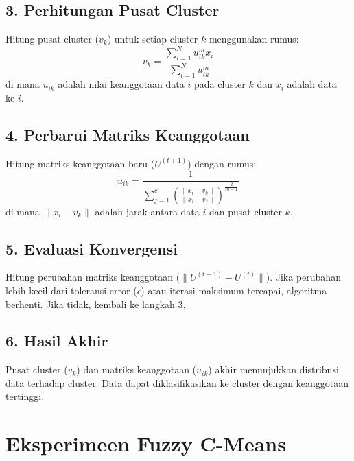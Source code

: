 \documentclass[
  oneside]{book}
\begin{document}
\subsection*{3. Perhitungan Pusat Cluster}\label{perhitungan-pusat-cluster}

Hitung pusat cluster (\(v_k\)) untuk setiap cluster \(k\) menggunakan rumus:
\[
     v_k = \frac{\sum_{i=1}^N u_{ik}^m x_i}{\sum_{i=1}^N u_{ik}^m}
     \]
di mana \(u_{ik}\) adalah nilai keanggotaan data \(i\) pada cluster \(k\) dan \(x_i\) adalah data ke-\(i\).

\subsection*{4. Perbarui Matriks Keanggotaan}\label{perbarui-matriks-keanggotaan}

Hitung matriks keanggotaan baru (\(U^{(t+1)}\)) dengan rumus:
\[
     u_{ik} = \frac{1}{\sum_{j=1}^c \left( \frac{\|x_i - v_k\|}{\|x_i - v_j\|} \right)^{\frac{2}{m-1}}}
     \]
di mana \(\|x_i - v_k\|\) adalah jarak antara data \(i\) dan pusat cluster \(k\).

\subsection*{5. Evaluasi Konvergensi}\label{evaluasi-konvergensi}

Hitung perubahan matriks keanggotaan (\(\|U^{(t+1)} - U^{(t)}\|\)).
Jika perubahan lebih kecil dari toleransi error (\(\epsilon\)) atau iterasi maksimum tercapai, algoritma berhenti. Jika tidak, kembali ke langkah 3.

\subsection*{6. Hasil Akhir}\label{hasil-akhir-2}

Pusat cluster (\(v_k\)) dan matriks keanggotaan (\(u_{ik}\)) akhir menunjukkan distribusi data terhadap cluster. Data dapat diklasifikasikan ke cluster dengan keanggotaan tertinggi.

\section{Eksperimeen Fuzzy C-Means}\label{eksperimeen-fuzzy-c-means}
\end{document}
